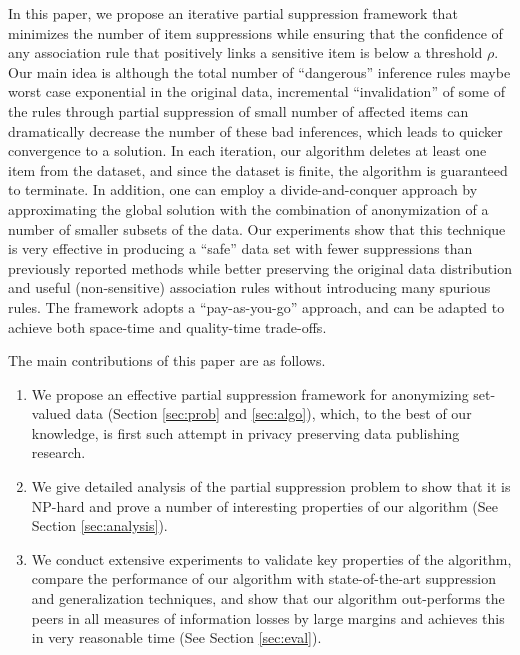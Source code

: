 In this paper, we propose an iterative partial suppression framework that
minimizes the number of item suppressions while ensuring that the confidence
of any association rule that positively links a sensitive item is below
a threshold $\rho$. Our main idea is although the total number of
``dangerous'' inference rules maybe worst case exponential in the original
data, incremental ``invalidation'' of some of the rules through
partial suppression of small number of affected items can
dramatically decrease the number of these bad inferences,
which leads to quicker convergence to a solution.
In each iteration, our algorithm deletes at least one item from the dataset, 
and since the dataset is finite, the algorithm is
guaranteed to terminate. In addition, one can employ
a divide-and-conquer approach by approximating the global solution with
the combination of anonymization of a number of smaller subsets of the data.
Our experiments show that this technique is very effective in producing
a ``safe'' data set with fewer suppressions than previously reported
methods while better preserving the original data distribution and
useful (non-sensitive) association rules without introducing many spurious
rules. The framework adopts a ``pay-as-you-go'' approach, and can be
adapted to achieve both space-time and quality-time trade-offs.

The main contributions of this paper are as follows.
\begin{enumerate}
\item We propose an effective partial suppression framework for
 anonymizing set-valued data (Section \ref{sec:prob} and \ref{sec:algo}),
which, to the best of our knowledge, is
first such attempt in privacy preserving data publishing research.
\item We give detailed analysis of the partial suppression problem to show
that it is NP-hard and prove a number of interesting properties of our
algorithm (See Section \ref{sec:analysis}).
\item We conduct extensive experiments to validate key properties of the
algorithm, compare the performance of our
algorithm with state-of-the-art suppression and generalization techniques,
and show that our algorithm out-performs the peers in
all measures of information losses by large margins and achieves this in
very reasonable time (See Section \ref{sec:eval}).
\end{enumerate}


